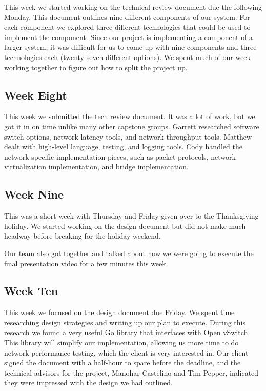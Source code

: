 \documentclass[10pt,onecolumn,journal,draftclsnofoot]{IEEEtran}
\begin{document}
This week we started working on the technical review document due the following
Monday. This document outlines nine different components of our system. For each
component we explored three different technologies that could be used to
implement the component. Since our project is implementing a component of a
larger system, it was difficult for us to come up with nine components and three
technologies each (twenty-seven different options). We spent much of our week
working together to figure out how to split the project up.

\subsection{Week Eight}

This week we submitted the tech review document. It was a lot of work, but we
got it in on time unlike many other capstone groups. Garrett researched software
switch options, network latency tools, and network throughput tools. Matthew
dealt with high-level language, testing, and logging tools. Cody handled the
network-specific implementation pieces, such as packet protocols, network
virtualization implementation, and bridge implementation.

\subsection{Week Nine}

This was a short week with Thursday and Friday given over to the Thanksgiving
holiday. We started working on the design document but did not make much headway
before breaking for the holiday weekend.

Our team also got together and talked about how we were going to execute the
final presentation video for a few minutes this week.

\subsection{Week Ten}

This week we focused on the design document due Friday. We spent time
researching design strategies and writing up our plan to execute. During this
research we found a very useful Go library that interfaces with Open vSwitch.
This library will simplify our implementation, allowing us more time to do
network performance testing, which the client is very interested in. Our client
signed the document with a half-hour to spare before the deadline, and the
technical advisors for the project, Manohar Castelino and Tim Pepper, indicated
they were impressed with the design we had outlined.
\end{document}
